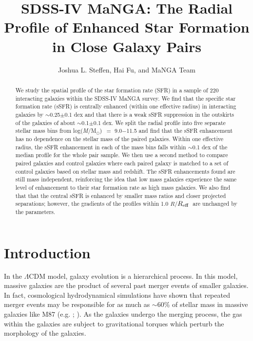 \documentclass[iop,revtex4,twocolumn,apj,numberedappendix,appendixfloats]{emulateapj}
\newcommand{\reff}{$R_{\rm eff}$}
\newcommand{\logm}{log({\it M}/M$_{\odot}$)}
\begin{document}
\title{
SDSS-IV MaNGA: The Radial Profile of Enhanced Star Formation in Close Galaxy Pairs
}

\author{
Joshua L. Steffen, 
Hai Fu, and 
MaNGA Team 
}

\begin{abstract}
We study the spatial profile of the star formation rate (SFR) in a sample of 220 interacting galaxies within the SDSS-IV MaNGA survey. We find that the specific star formation rate (sSFR) is centrally enhanced (within one effective radius) in interacting galaxies by $\sim$0.25$\pm$0.1 dex and that there is a weak sSFR suppression in the outskirts of the galaxies of about $\sim$0.1$\pm$0.1 dex. We split the radial profile into five separate stellar mass bins from \logm\ $=$ 9.0$-$11.5 and find that the sSFR enhancement has no dependence on the stellar mass of the paired galaxies. Within one effective radius, the sSFR enhancement in each of the mass bins falls within $\sim$0.1 dex of the median profile for the whole pair sample. We then use a second method to compare paired galaxies and control galaxies where each paired galaxy is matched to a set of control galaxies based on stellar mass and redshift. The sSFR enhancements found are still mass independent, reinforcing the idea that low mass galaxies experience the same level of enhancement to their star formation rate as high mass galaxies. We also find that that the central sSFR is enhanced by smaller mass ratios and closer projected separations; however, the gradients of the profiles within 1.0 $R$/\reff\ are unchanged by the parameters.
\end{abstract}


\section{Introduction}\label{sec:intro}

In the $\Lambda$CDM model, galaxy evolution is a hierarchical process. In this model, massive galaxies are the product of several past merger events of smaller galaxies. In fact, cosmological hydrodynamical simulations have shown that repeated merger events may be responsible for as much as $\sim$60\% of stellar mass in massive galaxies like M87 (e.g. \citet{Rodriguez-Gomez:2016}; \citet{Pillepich:2018}). As the galaxies undergo the merging process, the gas within the galaxies are subject to gravitational torques which perturb the morphology of the galaxies.
\end{document}
